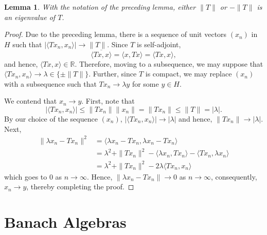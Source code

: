 \documentclass[11pt]{article}
\theoremstyle{thmstyle}
\newtheorem{lemma}[theorem]{Lemma}
\theoremstyle{defstyle}
\newcommand{\R}{\mathbb{R}}
\renewcommand{\le}{\leqslant}
\begin{document}
\begin{lemma}
    With the notation of the preceding lemma, either $\|T\|$ or $-\|T\|$ is an eigenvalue of $T$.
\end{lemma}
\begin{proof}
    Due to the preceding lemma, there is a sequence of unit vectors $(x_n)$ in $H$ such that $|\langle Tx_n, x_n\rangle|\to \|T\|$. Since $T$ is self-adjoint, 
    \begin{equation*}
        \overline{\langle Tx, x\rangle} = \langle x, Tx\rangle = \langle Tx, x\rangle,
    \end{equation*}
    and hence, $\langle Tx, x\rangle\in\R$. Therefore, moving to a subsequence, we may suppose that $\langle Tx_n, x_n\rangle\to\lambda\in\{\pm\|T\|\}$. Further, since $T$ is compact, we may replace $(x_n)$ with a subsequence such that $Tx_n\to \lambda y$ for some $y\in H$. 

    We contend that $x_n\to y$. First, note that 
    \begin{equation*}
        |\langle Tx_n, x_n\rangle|\le\|Tx_n\|\|x_n\| = \|Tx_n\|\le\|T\| = |\lambda|.
    \end{equation*}
    By our choice of the sequence $(x_n)$, $|\langle Tx_n, x_n\rangle|\to|\lambda|$ and hence, $\|Tx_n\|\to|\lambda|$. Next, 
    \begin{align*}
        \|\lambda x_n - Tx_n\|^2 &= \langle \lambda x_n - Tx_n, \lambda x_n - Tx_n\rangle\\
        &= \lambda^2 + \|Tx_n\|^2 - \langle\lambda x_n, Tx_n\rangle - \langle Tx_n,\lambda x_n\rangle\\
        &= \lambda^2 + \|Tx_n\|^2 - 2\lambda\langle Tx_n, x_n\rangle
    \end{align*}
    which goes to $0$ as $n\to\infty$. Hence, $\|\lambda x_n - Tx_n\|\to 0$ as $n\to\infty$, consequently, $x_n\to y$, thereby completing the proof.
\end{proof}

\section{Banach Algebras}
\end{document}
